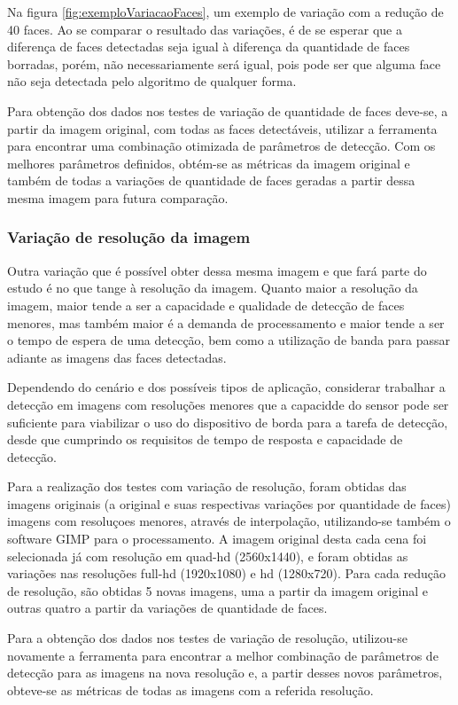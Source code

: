Na figura \ref{fig:exemploVariacaoFaces}, um exemplo de variação com a redução de 40 faces. Ao se comparar o resultado das variações, é de se esperar que a diferença de faces detectadas seja igual à diferença da quantidade de faces borradas, porém, não necessariamente será igual, pois pode ser que alguma face não seja detectada pelo algoritmo de qualquer forma.

Para obtenção dos dados nos testes de variação de quantidade de faces deve-se, a partir da imagem original, com todas as faces detectáveis, utilizar a ferramenta para encontrar uma combinação otimizada de parâmetros de detecção. Com os melhores parâmetros definidos, obtém-se as métricas da imagem original e também de todas a variações de quantidade de faces geradas a partir dessa mesma imagem para futura comparação.

\subsubsection{Variação de resolução da imagem}

Outra variação que é possível obter dessa mesma imagem e que fará parte do estudo é no que tange à resolução da imagem. Quanto maior a resolução da imagem, maior tende a ser a capacidade e qualidade de detecção de faces menores, mas também maior é a demanda de processamento e maior tende a ser o tempo de espera de uma detecção, bem como a utilização de banda para passar adiante as imagens das faces detectadas.

Dependendo do cenário e dos possíveis tipos de aplicação, considerar trabalhar a detecção em imagens com resoluções menores que a capacidde do sensor pode ser suficiente para viabilizar o uso do dispositivo de borda para a tarefa de detecção, desde que cumprindo os requisitos de tempo de resposta e capacidade de detecção.

Para a realização dos testes com variação de resolução, foram obtidas das imagens originais (a original e suas respectivas variações por quantidade de faces) imagens com resoluçoes menores, através de interpolação, utilizando-se também o software GIMP para o processamento. A imagem original desta cada cena foi selecionada já com resolução em quad-hd (2560x1440), e foram obtidas as variações nas resoluções full-hd (1920x1080) e hd (1280x720). Para cada redução de resolução, são obtidas 5 novas imagens, uma a partir da imagem original e outras quatro a partir da variações de quantidade de faces.

Para a obtenção dos dados nos testes de variação de resolução, utilizou-se novamente a ferramenta para encontrar a melhor combinação de parâmetros de detecção para as imagens na nova resolução e, a partir desses novos parâmetros, obteve-se as métricas de todas as imagens com a referida resolução.

